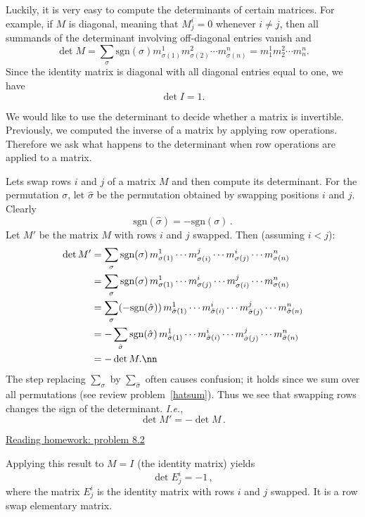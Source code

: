 Luckily, it is very easy to compute the determinants of certain matrices.  For example, if $M$ is diagonal, meaning that $M^i_j=0$ whenever $i\neq j$,  then all summands of the determinant involving off-diagonal entries vanish and 
\[
\det M = \sum_{\sigma} \text{sgn}(\sigma) m^1_{\sigma(1)}m^2_{\sigma(2)}\cdots m^n_{\sigma(n)}= m^1_{1}m^2_{2}\cdots m^n_{n}.
\]
Since the identity matrix is diagonal with all diagonal entries equal to one, we have
\[
\det I=1.
\]

We would like to use the determinant to decide whether a matrix is invertible.  Previously, we computed the inverse of a matrix by applying row operations.  Therefore we ask what happens to the determinant when row operations are applied to a matrix.

\begin{remark}
Lets \hypertarget{rowswap}{swap}
 rows $i$ and $j$ of  a matrix $M$ and then compute its determinant.  For the permutation $\sigma$, let $\hat{\sigma}$ be the permutation obtained by swapping positions $i$ and $j$.  Clearly \[\text{sgn}(\hat{\sigma})=-\text{sgn}(\sigma)\, .\]  Let  $M'$ be the matrix $M$ with rows $i$ and $j$ swapped.  Then  (assuming $i<j$):
\begin{align}
\det M' & = \sum_{\sigma} \text{sgn}(\sigma)\, m^1_{\sigma(1)}\cdots m^j_{\sigma(i)}\cdots m^i_{\sigma(j)} \cdots m^n_{\sigma(n)} \nonumber \\
& = \sum_{\sigma} \text{sgn}(\sigma) \,m^1_{\sigma(1)}\cdots m^i_{\sigma(j)}\cdots m^j_{\sigma(i)} \cdots m^n_{\sigma(n)} \nonumber \\
& = \sum_{\sigma}(-\text{sgn}(\hat{\sigma})) \,m^1_{\hat{\sigma}(1)}\cdots m^i_{\hat{\sigma}(i)}\cdots m^j_{\hat{\sigma}(j)} \cdots m^n_{\hat{\sigma}(n)} \nonumber \\
& = - \sum_{\hat{\sigma}} \text{sgn}(\hat{\sigma}) \,m^1_{\hat{\sigma}(1)}\cdots m^i_{\hat{\sigma}(i)}\cdots m^j_{\hat{\sigma}(j)} \cdots m^n_{\hat{\sigma}(n)} \nonumber \\
& = -\det M.\nn
\end{align}
The step replacing $\sum_\sigma$ by $\sum_{\hat \sigma}$ often causes confusion; it holds since we sum over all permutations (see review problem~\ref{hatsum}).
Thus we see that swapping rows changes the sign of the determinant. {\itshape I.e.}, \[\det M' = - \det M\, .\]

\begin{center}\href{\webworkurl ReadingHomework8/2/}{Reading homework: problem 8.2}\end{center}

Applying this result to $M=I$ (the identity matrix) yields
\[\det E^i_j=-1\, ,\]
where the matrix $E^i_j$ is the identity matrix with rows $i$ and $j$ swapped. It is a row swap  elementary matrix.

\end{remark}

